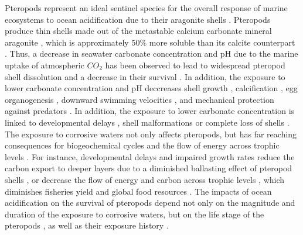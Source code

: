 Pteropods represent an ideal sentinel species for the overall response of marine ecosystems to ocean acidification due to their aragonite shells \citep{Orr2005Acidification,Bednarsek2017ApplicationPteropodShell}. Pteropods produce thin shells made out of the metastable calcium carbonate mineral aragonite \citep{lalli1989pelagic}, which is approximately $50\%$ more soluble than its calcite counterpart \citep{Mucci1983Metastable}. Thus, a decrease in seawater carbonate concentration and pH due to the marine uptake  of  atmospheric $CO_2$ \citep{Doney2009OtherCO2} has been observed to lead  to  widespread  pteropod  shell  dissolution  and  a  decrease in their survival \citep{Wall_Palmer2013dissolution,Bednarsek2017ApplicationPteropodShell,Manno2017ReviewPteropodVulnerability}. In addition, the exposure to lower carbonate concentration and pH deccreases shell growth \citep{Comeau2010RepairRates,Bednarsek2014CalcificationDissolution}, calcification \citep{Moya2016NervousSystem}, egg organogenesis \citep{Manno2016EggsAcidification}, downward swimming velocities \citep{Bednarsek2014CalcificationDissolution,Bergan2017SwimmingSinkingSpeeds}, and mechanical protection against predators \citep{lalli1989pelagic,Comeau2010Predation}. In addition, the exposure to lower carbonate concentration is linked to developmental delays \citep{Thabet2015Lifestages}, shell malformations or complete loss of shells \citep{Comeau2010Predation}. The exposure to corrosive waters not only affects pteropods, but has far reaching consequences for biogeochemical cycles \citep[e.g. ][]{Bednarsek2014CalcificationDissolution} and the flow of energy across trophic levels \citep[e.g. ][]{Capuzzo2017AbundanceRecruitment}. For instance, developmental delays and impaired growth rates reduce the carbon export to deeper layers due to a diminished ballasting effect of pteropod shells \citep{Klaas2002Ballast,Bednarsek2014CalcificationDissolution}, or decrease the flow of energy and carbon across trophic levels \citep{Capuzzo2017AbundanceRecruitment}, which diminishes fisheries yield \citep{ware2005bottom} and global food resources \citep{Chassot2010Protein}. The impacts of ocean acidification on the survival of pteropods depend not only on the magnitude and duration of the exposure to corrosive waters, but on the life stage of the pteropods \citep{Bednarsek2016CumulativeEffects}, as well as their exposure history \citep{Bednarsek2017ExposureHistory}. 



